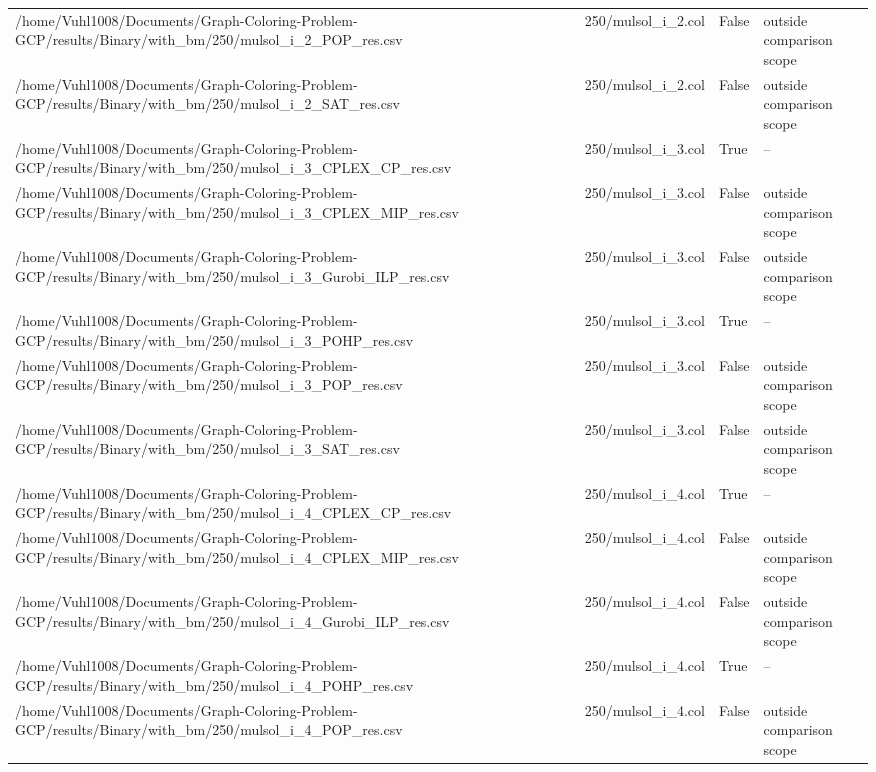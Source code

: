 \begin{table}[htbp]
\begin{tabular}{llll}
/home/Vuhl1008/Documents/Graph-Coloring-Problem-GCP/results/Binary/with\_bm/250/mulsol\_i\_2\_POP\_res.csv & 250/mulsol\_i\_2.col & False & outside comparison scope \\
/home/Vuhl1008/Documents/Graph-Coloring-Problem-GCP/results/Binary/with\_bm/250/mulsol\_i\_2\_SAT\_res.csv & 250/mulsol\_i\_2.col & False & outside comparison scope \\
/home/Vuhl1008/Documents/Graph-Coloring-Problem-GCP/results/Binary/with\_bm/250/mulsol\_i\_3\_CPLEX\_CP\_res.csv & 250/mulsol\_i\_3.col & True & -- \\
/home/Vuhl1008/Documents/Graph-Coloring-Problem-GCP/results/Binary/with\_bm/250/mulsol\_i\_3\_CPLEX\_MIP\_res.csv & 250/mulsol\_i\_3.col & False & outside comparison scope \\
/home/Vuhl1008/Documents/Graph-Coloring-Problem-GCP/results/Binary/with\_bm/250/mulsol\_i\_3\_Gurobi\_ILP\_res.csv & 250/mulsol\_i\_3.col & False & outside comparison scope \\
/home/Vuhl1008/Documents/Graph-Coloring-Problem-GCP/results/Binary/with\_bm/250/mulsol\_i\_3\_POHP\_res.csv & 250/mulsol\_i\_3.col & True & -- \\
/home/Vuhl1008/Documents/Graph-Coloring-Problem-GCP/results/Binary/with\_bm/250/mulsol\_i\_3\_POP\_res.csv & 250/mulsol\_i\_3.col & False & outside comparison scope \\
/home/Vuhl1008/Documents/Graph-Coloring-Problem-GCP/results/Binary/with\_bm/250/mulsol\_i\_3\_SAT\_res.csv & 250/mulsol\_i\_3.col & False & outside comparison scope \\
/home/Vuhl1008/Documents/Graph-Coloring-Problem-GCP/results/Binary/with\_bm/250/mulsol\_i\_4\_CPLEX\_CP\_res.csv & 250/mulsol\_i\_4.col & True & -- \\
/home/Vuhl1008/Documents/Graph-Coloring-Problem-GCP/results/Binary/with\_bm/250/mulsol\_i\_4\_CPLEX\_MIP\_res.csv & 250/mulsol\_i\_4.col & False & outside comparison scope \\
/home/Vuhl1008/Documents/Graph-Coloring-Problem-GCP/results/Binary/with\_bm/250/mulsol\_i\_4\_Gurobi\_ILP\_res.csv & 250/mulsol\_i\_4.col & False & outside comparison scope \\
/home/Vuhl1008/Documents/Graph-Coloring-Problem-GCP/results/Binary/with\_bm/250/mulsol\_i\_4\_POHP\_res.csv & 250/mulsol\_i\_4.col & True & -- \\
/home/Vuhl1008/Documents/Graph-Coloring-Problem-GCP/results/Binary/with\_bm/250/mulsol\_i\_4\_POP\_res.csv & 250/mulsol\_i\_4.col & False & outside comparison scope \\

\end{tabular}
\end{table}
